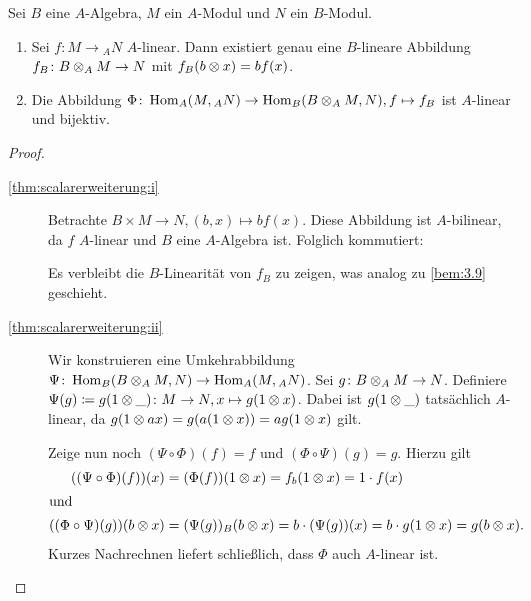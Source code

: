 \documentclass[12pt,a4paper]{scrartcl}
\theoremstyle{cplain}
\theoremstyle{cdef}
\begin{document}
\begin{satz}
	Sei $B$ eine $A$-Algebra, $M$ ein $A$-Modul und $N$ ein $B$-Modul.
	\begin{enumerate}
		\item Sei $f\colon M\to {}_AN$ $A$-linear. Dann existiert genau eine $B$-lineare Abbildung $f_B\colon B\otimes_AM\to N$ mit $f_B(b\otimes x) = bf(x)$. \label{thm:scalarerweiterung:i}
		\item Die Abbildung $\Phi\colon \operatorname{Hom}_A(M,{}_AN)\to \operatorname{Hom}_B(B\otimes_AM,N), f\mapsto f_B$ ist $A$-linear und bijektiv. \label{thm:scalarerweiterung:ii}
	\end{enumerate}
\end{satz}
\begin{proof}
	\leavevmode
	\begin{description}
		\item[\ref{thm:scalarerweiterung:i}] Betrachte $B\times M\to N, (b,x)\mapsto bf(x)$. Diese Abbildung ist $A$-bilinear, da $f$ $A$-linear und $B$ eine $A$-Algebra ist. Folglich kommutiert:
		\begin{center}
		\end{center}
		Es verbleibt die $B$-Linearität von $f_B$ zu zeigen, was analog zu \cref{bem:3.9} geschieht.
		\item[\ref{thm:scalarerweiterung:ii}] Wir konstruieren eine Umkehrabbildung $\Psi\colon \operatorname{Hom}_B(B\otimes_AM,N)\to \operatorname{Hom}_A(M,{}_AN)$. Sei $g\colon B\otimes_AM\to N$. Definiere $\Psi(g) \coloneqq g(1\otimes \_)\colon M\to N, x\mapsto g(1\otimes x)$.
		Dabei ist $g(1\otimes\_)$ tatsächlich $A$-linear, da $g(1\otimes ax ) = g(a(1\otimes x)) = ag(1\otimes x)$ gilt.
		
		Zeige nun noch $(\Psi\circ \Phi)(f) = f$ und $(\Phi\circ\Psi)(g) = g$. Hierzu gilt
		\begin{align*}
			((\Psi\circ\Phi)(f))(x) &= (\Phi(f))(1\otimes x) = f_b(1\otimes x) =1\cdot f(x) \\
			\intertext{und}
			((\Phi\circ\Psi)(g))(b\otimes x) &= (\Psi(g))_B(b\otimes x) = b\cdot (\Psi(g))(x) = b\cdot g(1\otimes x) = g(b\otimes x).
		\end{align*}
		Kurzes Nachrechnen liefert schließlich, dass $\Phi$ auch $A$-linear ist.
		\qedhere
	\end{description}	
\end{proof}
\end{document}
